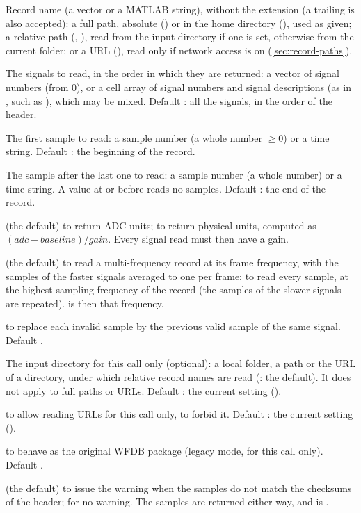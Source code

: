 \begin{params}
\item[record] Record name (a  vector or a MATLAB string), without the  extension (a trailing 
  is also accepted): a full path, absolute () or in the home
  directory (), used as given; a relative path
  (, ), read from the input directory if one is set,
  otherwise from the current folder; or a URL
  (), read only if network access is
  on (\cref{sec:record-paths}).
\item[channels] The signals to read, in the order in which they are returned: a vector of
  signal numbers (from 0), or a cell array of signal numbers and signal descriptions (as
  in , such as ), which may be mixed. Default \code{[]}: all
  the signals, in the order of the header.
\item[sampfrom] The first sample to read: a sample number (a whole number $\ge 0$) or a
  time string. Default : the beginning of the record.
\item[sampto] The sample after the last one to read: a sample number (a whole number) or
  a time string. A value at or before  reads no samples. Default
  \code{[]}: the end of the record.
\item[physical]  (the default) to return ADC units;  to return
  physical units, computed as $(\mathit{adc} - \mathit{baseline}) / \mathit{gain}$. Every
  signal read must then have a gain.
\item[highres]  (the default) to read a multi-frequency record at its frame
  frequency, with the samples of the faster signals averaged to one per frame;
   to read every sample, at the highest sampling frequency of the record (the
  samples of the slower signals are repeated).  is then that frequency.
\item[pad]  to replace each invalid sample by the previous valid sample of the
  same signal. Default .
\item[input\_dir] The input directory for this call only (optional): a local folder, a
  \code{\textasciitilde} path or the URL of a directory, under which relative record names
  are read (: the default). It does not apply to full paths or URLs. Default
  \code{[]}: the current setting ().
\item[network]  to allow reading URLs for this call only,  to
  forbid it. Default \code{[]}: the current setting ().
\item[legacy]  to behave as the original WFDB package (legacy mode, for this
  call only). Default .
\item[checksum\_warning]  (the default) to issue the warning
   when the samples do not match the checksums of the header;
   for no warning. The samples are returned either way, and
   is .
\end{params}
